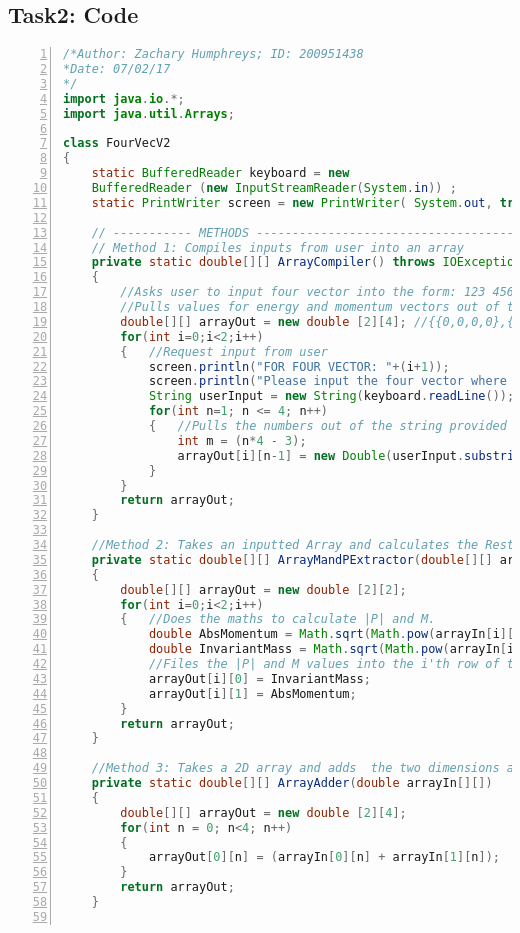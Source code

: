 \documentclass{article}
\begin{document}
\subsection{Task2: Code}
\begin{lstlisting}[language=java, numbers=left, tabsize=1, showspaces=false, showstringspaces=false]
/*Author: Zachary Humphreys; ID: 200951438
*Date: 07/02/17
*/
import java.io.*;
import java.util.Arrays;

class FourVecV2
{
	static BufferedReader keyboard = new
	BufferedReader (new InputStreamReader(System.in)) ;
	static PrintWriter screen = new PrintWriter( System.out, true);
	
	// ----------- METHODS ----------------------------------------------------------------------------------------
	// Method 1: Compiles inputs from user into an array
	private static double[][] ArrayCompiler() throws IOException
	{
		//Asks user to input four vector into the form: 123 456 789 012
		//Pulls values for energy and momentum vectors out of the string and compiles them in an array
		double[][] arrayOut = new double [2][4]; //{{0,0,0,0},{0,0,0,0}};
		for(int i=0;i<2;i++)
		{   //Request input from user
			screen.println("FOR FOUR VECTOR: "+(i+1));
			screen.println("Please input the four vector where each four vector has 3 digits and each is separated by a space:\t");
			String userInput = new String(keyboard.readLine());
			for(int n=1; n <= 4; n++)
			{   //Pulls the numbers out of the string provided in triplets of characters
				int m = (n*4 - 3);
				arrayOut[i][n-1] = new Double(userInput.substring(m-1,m+2)).doubleValue();
			}
		}
		return arrayOut;
	}
	
	//Method 2: Takes an inputted Array and calculates the Rest Mass and Invariant Momentum
	private static double[][] ArrayMandPExtractor(double[][] arrayIn)
	{
		double[][] arrayOut = new double [2][2];
		for(int i=0;i<2;i++)
		{   //Does the maths to calculate |P| and M.
			double AbsMomentum = Math.sqrt(Math.pow(arrayIn[i][1],2) + Math.pow(arrayIn[i][2],2) + Math.pow(arrayIn[i][3],2));
			double InvariantMass = Math.sqrt(Math.pow(arrayIn[i][0],2)- Math.pow(AbsMomentum,2));
			//Files the |P| and M values into the i'th row of the new 2x2 array
			arrayOut[i][0] = InvariantMass;
			arrayOut[i][1] = AbsMomentum;
		}
		return arrayOut;
	}
	
	//Method 3: Takes a 2D array and adds  the two dimensions and puts them in top row
	private static double[][] ArrayAdder(double arrayIn[][])
	{   
		double[][] arrayOut = new double [2][4];
		for(int n = 0; n<4; n++)
		{
			arrayOut[0][n] = (arrayIn[0][n] + arrayIn[1][n]);
		}
		return arrayOut;
	}
	

\end{lstlisting}
\end{document}
